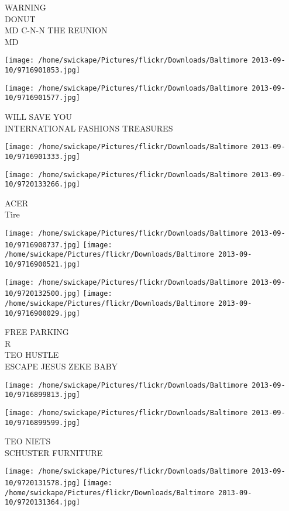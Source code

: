 \documentclass[10pt,letterpaper]{article}
\begin{document}
WARNING\\
DONUT\\
MD C{-}N{-}N THE REUNION\\
MD
\pagebreak

\texttt{[image: /home/swickape/Pictures/flickr/Downloads/Baltimore 2013-09-10/9716901853.jpg]}

\vspace{0.25in}
\texttt{[image: /home/swickape/Pictures/flickr/Downloads/Baltimore 2013-09-10/9716901577.jpg]}

WILL SAVE YOU\\
INTERNATIONAL FASHIONS TREASURES
\pagebreak

\texttt{[image: /home/swickape/Pictures/flickr/Downloads/Baltimore 2013-09-10/9716901333.jpg]}

\vspace{0.25in}
\texttt{[image: /home/swickape/Pictures/flickr/Downloads/Baltimore 2013-09-10/9720133266.jpg]}

ACER\\
Tire
\pagebreak

\texttt{[image: /home/swickape/Pictures/flickr/Downloads/Baltimore 2013-09-10/9716900737.jpg]}
\texttt{[image: /home/swickape/Pictures/flickr/Downloads/Baltimore 2013-09-10/9716900521.jpg]}

\texttt{[image: /home/swickape/Pictures/flickr/Downloads/Baltimore 2013-09-10/9720132500.jpg]}
\texttt{[image: /home/swickape/Pictures/flickr/Downloads/Baltimore 2013-09-10/9716900029.jpg]}

FREE PARKING\\
R\\
TEO HUSTLE\\
ESCAPE JESUS ZEKE BABY
\pagebreak

\texttt{[image: /home/swickape/Pictures/flickr/Downloads/Baltimore 2013-09-10/9716899813.jpg]}

\vspace{0.25in}
\texttt{[image: /home/swickape/Pictures/flickr/Downloads/Baltimore 2013-09-10/9716899599.jpg]}

TEO NIETS\\
SCHUSTER FURNITURE
\pagebreak

\texttt{[image: /home/swickape/Pictures/flickr/Downloads/Baltimore 2013-09-10/9720131578.jpg]}
\texttt{[image: /home/swickape/Pictures/flickr/Downloads/Baltimore 2013-09-10/9720131364.jpg]}
\end{document}
